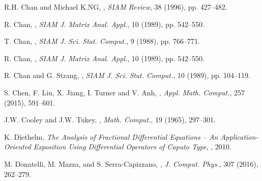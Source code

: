 \documentclass{ecnumaster}
\begin{document}
\begin{thebibliography}{99}
\newblock R.H. Chan and Michael K.NG,
,
\newblock \emph{SIAM Review}, 38 (1996), pp. 427--482.


\newblock R. Chan,
,
\newblock \emph{SIAM J. Matrix Anal. Appl.}, 10 (1989), pp. 542--550.

\newblock T. Chan,
,
\newblock \emph{SIAM J. Sci. Stat. Comput.}, 9 (1988),
pp. 766--771.

\newblock R. Chan,
,
\newblock \emph{SIAM J. Matrix Anal. Appl.}, 10 (1989), pp. 542--550.

\newblock R. Chan and G. Strang,
,
\newblock \emph{SIAM J.
Sci. Stat. Comput.}, 10 (1989), pp. 104--119.

\newblock S. Chen, F. Liu, X. Jiang, I. Turner and V. Anh,
,
\newblock \emph{Appl. Math. Comput.}, 257 (2015), 591--601.





\newblock J.W. Cooley and J.W. Tukey,
,
\newblock \emph{Math. Comput.}, 19 (1965), 297--301.

\newblock K. Diethelm,
\newblock \emph{The Analysis of Fractional Differential Equations – An Application-Oriented Exposition Using Differential Operators of Caputo Type},
, 2010.

\newblock M. Donatelli, M. Mazza, and S. Serra-Capizzano,
,
\newblock \emph{J. Comput. Phys.}, 307 (2016), 262--279.


\end{thebibliography}
\end{document}
